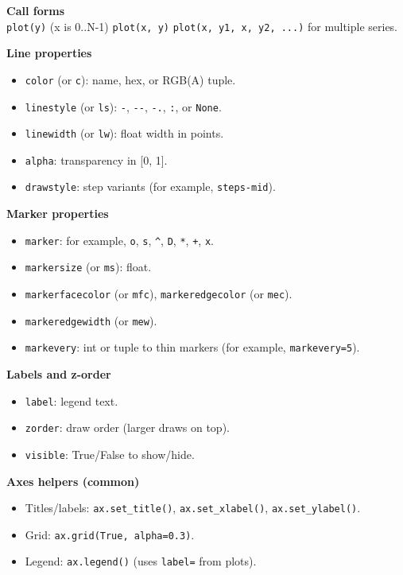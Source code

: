\begin{tcolorbox}[
    title=plot() function parameters,
    colframe=blue,
    colback=white,
    arc=2mm,
    breakable
]
\textbf{Call forms}\\
\texttt{plot(y)} (x is 0..N-1) \quad
\texttt{plot(x, y)} \quad
\texttt{plot(x, y1, x, y2, ...)} for multiple series.

\medskip
\textbf{Line properties}
\begin{itemize}
  \item \texttt{color} (or \texttt{c}): name, hex, or RGB(A) tuple.
  \item \texttt{linestyle} (or \texttt{ls}): \verb|-|, \verb|--|, \verb|-.|, \verb|:|, or \texttt{None}.
  \item \texttt{linewidth} (or \texttt{lw}): float width in points.
  \item \texttt{alpha}: transparency in [0, 1].
  \item \texttt{drawstyle}: step variants (for example, \texttt{steps-mid}).
\end{itemize}

\textbf{Marker properties}
\begin{itemize}
  \item \texttt{marker}: for example, \verb|o|, \verb|s|, \verb|^|, \verb|D|, \verb|*|, \verb|+|, \verb|x|.
  \item \texttt{markersize} (or \texttt{ms}): float.
  \item \texttt{markerfacecolor} (or \texttt{mfc}), \texttt{markeredgecolor} (or \texttt{mec}).
  \item \texttt{markeredgewidth} (or \texttt{mew}).
  \item \texttt{markevery}: int or tuple to thin markers (for example, \texttt{markevery=5}).
\end{itemize}

\textbf{Labels and z-order}
\begin{itemize}
  \item \texttt{label}: legend text.
  \item \texttt{zorder}: draw order (larger draws on top).
  \item \texttt{visible}: True/False to show/hide.
\end{itemize}

\textbf{Axes helpers (common)}
\begin{itemize}
  \item Titles/labels: \texttt{ax.set\_title()}, \texttt{ax.set\_xlabel()}, \texttt{ax.set\_ylabel()}.
  \item Grid: \texttt{ax.grid(True, alpha=0.3)}.
  \item Legend: \texttt{ax.legend()} (uses \texttt{label=} from plots).
\end{itemize}
\end{tcolorbox}

